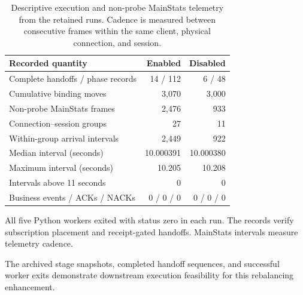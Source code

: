 \documentclass[10pt,a4paper]{article}
\begin{document}
\begin{table}[htbp]
\centering
\small
\caption{Descriptive execution and non-probe MainStats telemetry from the retained runs. Cadence is measured between consecutive frames within the same client, physical connection, and session.}
\label{tab:downstream-handoff-telemetry}
\begin{tabularx}{\textwidth}{@{}Xrr@{}}
\toprule
Recorded quantity & Enabled & Disabled \\
\midrule
Complete handoffs / phase records & 14 / 112 & 6 / 48 \\
Cumulative binding moves & 3,070 & 3,000 \\
Non-probe MainStats frames & 2,476 & 933 \\
Connection--session groups & 27 & 11 \\
Within-group arrival intervals & 2,449 & 922 \\
Median interval (seconds) & 10.000391 & 10.000380 \\
Maximum interval (seconds) & 10.205 & 10.208 \\
Intervals above 11 seconds & 0 & 0 \\
Business events / ACKs / NACKs & 0 / 0 / 0 & 0 / 0 / 0 \\
\bottomrule
\end{tabularx}
\end{table}

All five Python workers exited with status zero in each run. The records verify subscription placement and receipt-gated handoffs. MainStats intervals measure telemetry cadence.

The archived stage snapshots, completed handoff sequences, and successful worker exits demonstrate downstream execution feasibility for this rebalancing enhancement.

\FloatBarrier
\end{document}
